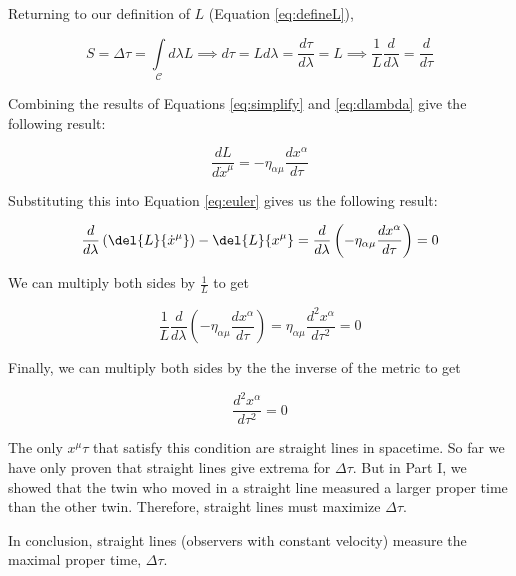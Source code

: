 \documentclass[11pt]{article}
\begin{document}
Returning to our definition of $L$ (Equation \ref{eq:defineL}),

\begin{equation}\label{eq:dlambda}
  S = \Delta\tau = \int\limits_{\mathcal{C}} d\lambda L \implies d\tau = L d\lambda = \frac{d\tau}{d\lambda} = L \implies \frac{1}{L}\frac{d}{d\lambda} = \frac{d}{d\tau}
\end{equation}

Combining the results of Equations \ref{eq:simplify} and \ref{eq:dlambda} give the following result:

\begin{equation}\label{eq:dLdxdot}
  \frac{dL}{d\dot{x}^\mu} = -\eta_{\alpha\mu}\frac{dx^\alpha}{d\tau}
\end{equation}

Substituting this into Equation \ref{eq:euler} gives us the following result:

\begin{equation}\label{eq:eulsimplified}
  \frac{d}{d\lambda} \left(\del{L}{\dot{x}^\mu} \right) - \del{L}{x^\mu} = \frac{d}{d\lambda} \left(-\eta_{\alpha\mu} \frac{dx^\alpha}{d\tau} \right) = 0
\end{equation}

We can multiply both sides by $\frac{1}{L}$ to get

\begin{equation}\label{eq:dividebyL}
  \frac{1}{L} \frac{d}{d\lambda} \left(-\eta_{\alpha\mu} \frac{dx^\alpha}{d\tau} \right) = \eta_{\alpha\mu} \frac{d^2 x^\alpha}{d\tau^2} = 0
\end{equation}

Finally, we can multiply both sides by the the inverse of the metric to get

\begin{equation}\label{eq:linear}
  \frac{d^2x^\alpha}{d\tau^2} = 0
\end{equation}

The only $x^\mu{\tau}$ that satisfy this condition are straight lines in spacetime. So far we have only proven that straight lines give extrema for $\Delta\tau$. But in Part I, we showed that the twin who moved in a straight line measured a larger proper time than the other twin. Therefore, straight lines must maximize $\Delta\tau$.

In conclusion, straight lines (observers with constant velocity) measure the maximal proper time, $\Delta\tau$.
\end{document}
